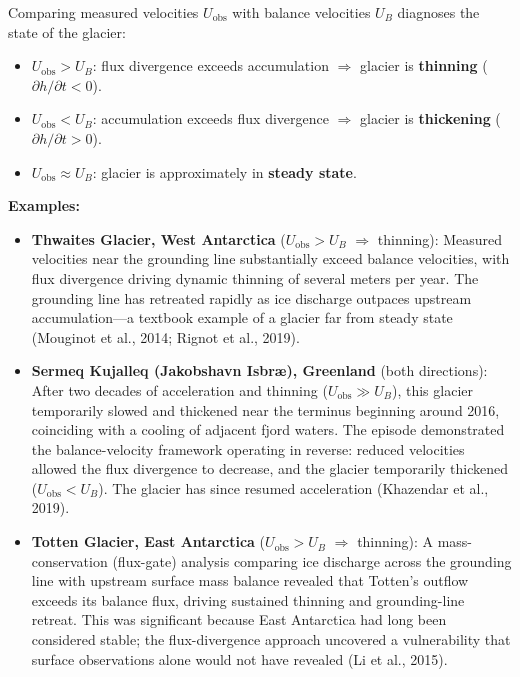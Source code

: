\documentclass[11pt]{article}
\begin{document}
Comparing measured velocities $U_{\text{obs}}$ with balance velocities $U_B$ diagnoses the state of the glacier:
\begin{itemize}
  \item $U_{\text{obs}} > U_B$: flux divergence exceeds accumulation $\Rightarrow$ glacier is \textbf{thinning} ($\partial h/\partial t < 0$).
  \item $U_{\text{obs}} < U_B$: accumulation exceeds flux divergence $\Rightarrow$ glacier is \textbf{thickening} ($\partial h/\partial t > 0$).
  \item $U_{\text{obs}} \approx U_B$: glacier is approximately in \textbf{steady state}.
\end{itemize}

\noindent \textbf{Examples:}
\begin{itemize}
  \item \textbf{Thwaites Glacier, West Antarctica} ($U_{\text{obs}} > U_B$ $\Rightarrow$ thinning): Measured velocities near the grounding line substantially exceed balance velocities, with flux divergence driving dynamic thinning of several meters per year.  The grounding line has retreated rapidly as ice discharge outpaces upstream accumulation---a textbook example of a glacier far from steady state (Mouginot et al., 2014; Rignot et al., 2019).

  \item \textbf{Sermeq Kujalleq (Jakobshavn Isbr\ae), Greenland} (both directions): After two decades of acceleration and thinning ($U_{\text{obs}} \gg U_B$), this glacier temporarily slowed and thickened near the terminus beginning around 2016, coinciding with a cooling of adjacent fjord waters.  The episode demonstrated the balance-velocity framework operating in reverse: reduced velocities allowed the flux divergence to decrease, and the glacier temporarily thickened ($U_{\text{obs}} < U_B$).  The glacier has since resumed acceleration (Khazendar et al., 2019).

  \item \textbf{Totten Glacier, East Antarctica} ($U_{\text{obs}} > U_B$ $\Rightarrow$ thinning): A mass-conservation (flux-gate) analysis comparing ice discharge across the grounding line with upstream surface mass balance revealed that Totten's outflow exceeds its balance flux, driving sustained thinning and grounding-line retreat.  This was significant because East Antarctica had long been considered stable; the flux-divergence approach uncovered a vulnerability that surface observations alone would not have revealed (Li et al., 2015).
\end{itemize}
\end{document}
